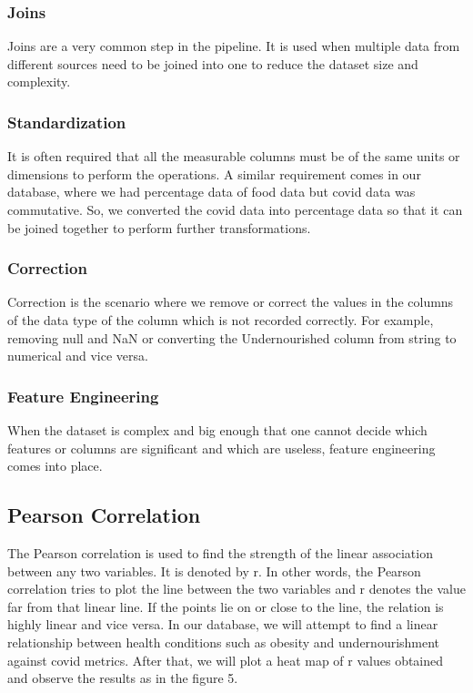 \documentclass[journal,twoside,web]{ieeecolor}
\begin{document}
\subsubsection{Joins}
Joins are a very common step in the pipeline. It is used when multiple data from different sources need to be joined into one to reduce the dataset size and complexity.

\subsubsection{Standardization}
It is often required that all the measurable columns must be of the same units or dimensions to perform the operations. A similar requirement comes in our database, where we had percentage data of food data but covid data was commutative. So, we converted the covid data into percentage data so that it can be joined together to perform further transformations.

\subsubsection{Correction}
Correction is the scenario where we remove or correct the values in the columns of the data type of the column which is not recorded correctly. For example, removing null and NaN or converting the Undernourished column from string to numerical and vice versa.

\subsubsection{Feature Engineering}
When the dataset is complex and big enough that one cannot decide which features or columns are significant and which are useless, feature engineering comes into place. 

\subsection{Pearson Correlation}
The Pearson correlation \cite{benesty2009pearson} is used to find the strength of the linear association between any two variables. It is denoted by r. In other words, the Pearson correlation tries to plot the line between the two variables and r denotes the value far from that linear line. If the points lie on or close to the line, the relation is highly linear and vice versa.
In our database, we will attempt to find a linear relationship between health conditions such as obesity and undernourishment against covid metrics.
After that, we will plot a heat map of r values obtained and observe the results as in the figure 5.
\end{document}
